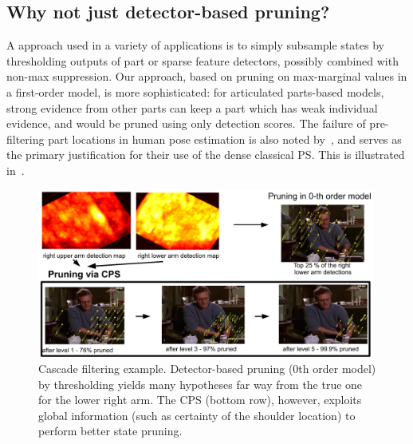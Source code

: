 \subsection{Why not just detector-based pruning?} A \naive approach used in a 
variety of applications is to simply subsample states by thresholding outputs 
of part or sparse feature detectors, possibly combined with non-max 
suppression.  Our approach, based on pruning on max-marginal values in a 
first-order model, is more sophisticated: for articulated parts-based models, 
strong evidence from other parts can keep a part which has weak individual 
evidence, and would be pruned using only detection scores.  The failure of 
pre-filtering  part locations in human pose estimation is also noted 
by~\citet{andriluka09}, and serves as the primary justification for their use 
of the dense classical PS.  This is illustrated in~.

\begin{figure}[tb]
\begin{center}
\includegraphics[width=0.99\textwidth]{figs/cascade-pruning.pdf}
\caption[Cascade filtering example]{Cascade filtering example. Detector-based 
pruning (0th order model) by thresholding yields many hypotheses far way from 
the true one for the lower right arm. The CPS (bottom row), however, exploits 
global information (such as certainty of the shoulder location) to perform 
better state pruning.}
\label{fig:cascade-pruning}
\end{center}
\end{figure}




